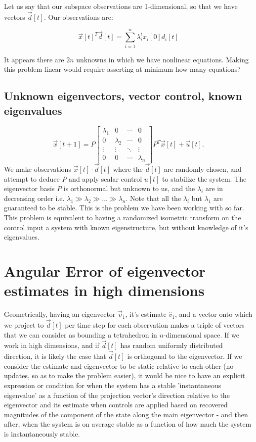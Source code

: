 \documentclass[letterpaper]{article}
\theoremstyle{remark}
\newcommand{\mat}[1]{\ensuremath{\begin{bmatrix}#1\end{bmatrix}}}
\begin{document}
Let us say that our subspace observations are 1-dimensional, so that we have vectors $\vec{d}[t]$. Our observations are:

\[
    \vec{x}[t]^T\vec{d}[t] = \sum_{i = 1}^n \lambda_i^tx_i[0]d_i[t]
\]

It appears there are $2n$ unknowns in which we have nonlinear equations. Making this problem linear would require asserting at minimum how many equations?


\subsection*{Unknown eigenvectors, vector control, known eigenvalues}
\[
    \vec{x}[t + 1] = P\mat{\lambda_1 & 0 & \cdots & 0 \\ 0 & \lambda_2 & \cdots & 0 \\ \vdots  & \vdots & \ddots & \vdots \\ 0 & 0 & \cdots & \lambda_n}P^T \vec{x}[t] + \vec{u}[t].
\]
We make observations $\vec{x}[t] \cdot \vec{d}[t]$ where the $\vec{d}[t]$ are randomly chosen, and attempt to deduce $P$ and apply scalar control $u[t]$ to stabilize the system. The eigenvector basis $P$ is orthonormal but unknown to us, and the $\lambda_i$ are in decreasing order i.e. $\lambda_1 \gg \lambda_2 \gg \ldots \gg \lambda_n$. Note that all the $\lambda_i$ but $\lambda_1$ are guaranteed to be stable. This is the problem we have been working with so far. This problem is equivalent to having a randomized isometric transform on the control input a system with known eigenstructure, but without knowledge of it's eigenvalues.

\section*{Angular Error of eigenvector estimates in high dimensions}

Geometrically, having an eigenvector $\vec{v}_1$, it's estimate $\hat{v}_1$, and a vector onto which we project to $\vec{d}[t]$ per time step for each observation makes a triple of vectors that we can consider as bounding a tetrahedron in $n$-dimensional space. If we work in high dimensions, and if $\vec{d}[t]$ has random uniformly distributed direction, it is likely the case that $\vec{d}[t]$ is orthogonal to the eigenvector. If we consider the estimate and eigenvector to be static relative to each other (no updates, so as to make the problem easier), it would be nice to have an explicit expression or condition for when the system has a stable 'instantaneous eigenvalue' as a function of the projection vector's direction relative to the eigenvector and its estimate when controls are applied based on recovered magnitudes of the component of the state along the main eigenvector - and then after, when the system is on average stable as a function of how much the system is instantaneously stable.
\end{document}
